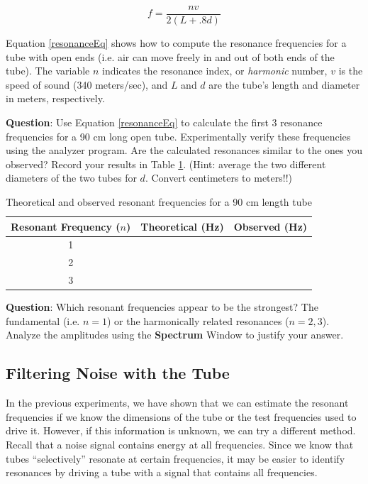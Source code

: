 \documentclass[12pt]{article}
\begin{document}
\begin{equation}
f = \frac{nv}{2 \left (L + .8d \right)}
\label{resonanceEq}
\end {equation}

Equation \ref{resonanceEq} shows how to compute the resonance frequencies for a tube with open ends (i.e. air can move freely in and out of both ends of the tube). The variable $n$ indicates the resonance index, or \emph{harmonic} number, $v$ is the speed of sound (340 meters/sec), and $L$ and $d$ are the tube's length and diameter in meters, respectively.

\vspace{15pt}

\textbf{Question}: Use Equation \ref{resonanceEq} to calculate the first 3 resonance frequencies for a 90 cm long open tube. Experimentally verify these frequencies using the analyzer program. Are the calculated resonances similar to the ones you observed? Record your results in Table \ref{EstResFreqTable}. (Hint: average the two different diameters of the two tubes for $d$. Convert centimeters to meters!!)

\begin{table}[h]
	\begin{center}
    		\begin{tabular}{| c | c | c |}
		    \hline
	    Resonant Frequency ($n$) & Theoretical (Hz) & Observed (Hz) \\ \hline
	    1 & &\\ \hline
	    2 & &\\ \hline
	    3 & &\\ \hline
	    \end{tabular}
	\caption{\label{EstResFreqTable} Theoretical and observed resonant frequencies for a 90 cm length tube}
	\end{center}
\end{table}

\vspace{.4in}

\textbf{Question}: Which resonant frequencies appear to be the strongest? The fundamental (i.e. $n = 1$) or the harmonically related resonances ($n=2, 3$). Analyze the amplitudes using the \textbf{Spectrum} Window to justify your answer.
\vspace{.5in}

\subsection{Filtering Noise with the Tube}
In the previous experiments, we have shown that we can estimate the resonant frequencies if we know the dimensions of the tube or the test frequencies used to drive it. However, if this information is unknown, we can try a different method. Recall that a noise signal contains energy at all frequencies. Since we know that tubes ``selectively'' resonate at certain frequencies, it may be easier to identify resonances by driving a tube with a signal that contains all frequencies.
\end{document}
